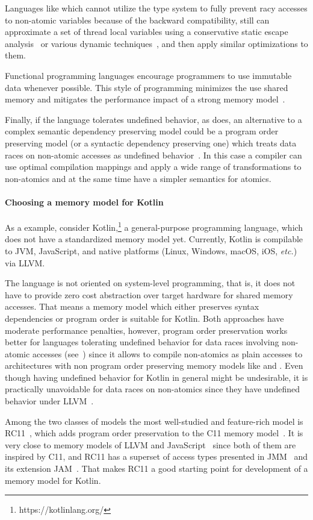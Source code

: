 Languages like \Java which cannot utilize the type system 
to fully prevent racy accesses to non-atomic variables 
because of the backward compatibility, still can 
approximate a set of thread local variables    
using a conservative static escape analysis~\cite{Choi-al:OOPSLA1999}
or various dynamic techniques~\cite{Liu-al:PLDI19},
and then apply similar optimizations to them. 

Functional programming languages encourage 
programmers to use immutable data whenever possible.
This style of programming minimizes the use 
shared memory and mitigates the performance impact 
of a strong memory model~\cite{Vollmer-al:PPoPP17}. 

Finally, if the language tolerates undefined behavior, as \CPP does, 
an alternative to a complex semantic dependency preserving model
could be a program order preserving model (or a syntactic dependency preserving one) 
which treats data races on non-atomic accesses as 
undefined behavior~\cite{Boehm-Demsky:MSPC14, Ou-Demsky:OOPSLA18}.
In this case a compiler can use optimal compilation mappings 
and apply a wide range of transformations to non-atomics 
and at the same time have a simpler semantics for atomics.

\paragraph{Choosing a memory model for Kotlin}
As a example, %
consider Kotlin,\footnote{https://kotlinlang.org/}
a general-purpose programming language,
which does not have a standardized memory model yet.
Currently, Kotlin is compilable to JVM, JavaScript, and native platforms
(Linux, Windows, macOS, iOS, \emph{etc.}) via LLVM.

The language is not oriented on system-level programming,
that is, it does not have to provide zero cost abstraction over target hardware
for shared memory accesses.
That means a memory model which either preserves syntax dependencies or program order is
suitable for Kotlin.
Both approaches have moderate performance penalties,
however, program order preservation works better for languages tolerating undefined behavior
for data races involving non-atomic accesses (see~\cite{Ou-Demsky:OOPSLA18})
since it allows to compile non-atomics as plain accesses to architectures with non program order preserving
memory models like \ARM and \POWER.
Even though having undefined behavior for Kotlin in general might be undesirable,
it is practically unavoidable for data races on non-atomics since they have undefined
behavior under LLVM~\cite{Chakraborty-Vafeiadis:CGO17}.

Among the two classes of models the most well-studied and feature-rich model is
RC11~\cite{Lahav-al:PLDI17}, which adds program order preservation to the C11 memory model~\cite{Batty-al:POPL11}.
It is very close to memory models of LLVM and JavaScript~\cite{Watt-al:PLDI20}
since both of them are inspired by C11, and RC11 has a superset of access types presented in JMM~\cite{Manson-al:POPL05}
and its extension JAM~\cite{Bender-Palsberg:OOPSLA19}.
That makes RC11 a good starting point for development of a memory model for Kotlin.
